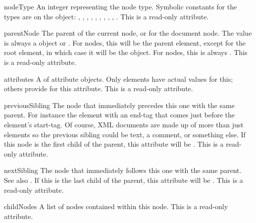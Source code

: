 \begin{memberdesc}[Node]{nodeType}
An integer representing the node type.  Symbolic constants for the
types are on the  object:
, ,
, ,
, ,
, ,
, .
This is a read-only attribute.
\end{memberdesc}

\begin{memberdesc}[Node]{parentNode}
The parent of the current node, or  for the document node.
The value is always a  object or .  For
 nodes, this will be the parent element, except for the
root element, in which case it will be the  object.
For  nodes, this is always .
This is a read-only attribute.
\end{memberdesc}

\begin{memberdesc}[Node]{attributes}
A  of attribute objects.  Only elements have
actual values for this; others provide  for this attribute.
This is a read-only attribute.
\end{memberdesc}

\begin{memberdesc}[Node]{previousSibling}
The node that immediately precedes this one with the same parent.  For
instance the element with an end-tag that comes just before the
 element's start-tag.  Of course, XML documents are made
up of more than just elements so the previous sibling could be text, a
comment, or something else.  If this node is the first child of the
parent, this attribute will be .
This is a read-only attribute.
\end{memberdesc}

\begin{memberdesc}[Node]{nextSibling}
The node that immediately follows this one with the same parent.  See
also .  If this is the last child of the
parent, this attribute will be .
This is a read-only attribute.
\end{memberdesc}

\begin{memberdesc}[Node]{childNodes}
A list of nodes contained within this node.
This is a read-only attribute.
\end{memberdesc}


